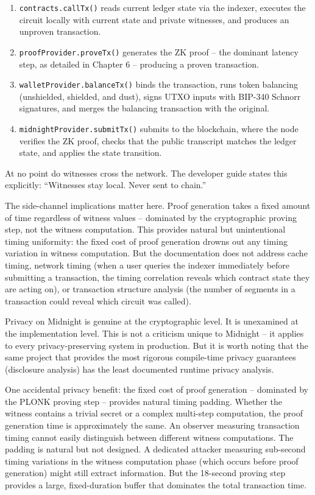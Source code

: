 \documentclass[
  11pt,
  openany]{report}
\begin{document}
\begin{enumerate}
\def\labelenumi{\arabic{enumi}.}
\item
  \texttt{contracts.callTx()} reads current ledger state via the indexer,
  executes the circuit locally with current state and private witnesses, and
  produces an unproven transaction.
\item
  \texttt{proofProvider.proveTx()} generates the ZK proof -- the dominant
  latency step, as detailed in Chapter 6 -- producing a proven transaction.
\item
  \texttt{walletProvider.balanceTx()} binds the transaction, runs token
  balancing (unshielded, shielded, and dust), signs UTXO inputs with BIP-340
  Schnorr signatures, and merges the balancing transaction with the original.
\item
  \texttt{midnightProvider.submitTx()} submits to the blockchain, where the node
  verifies the ZK proof, checks that the public transcript matches the ledger
  state, and applies the state transition.
\end{enumerate}

At no point do witnesses cross the network. The developer guide states this
explicitly: ``Witnesses stay local. Never sent to chain.''

The side-channel implications matter here. Proof generation takes a fixed amount
of time regardless of witness values -- dominated by the cryptographic proving
step, not the witness computation. This provides natural but unintentional
timing uniformity: the fixed cost of proof generation drowns out any timing
variation in witness computation. But the documentation does not address cache
timing, network timing (when a user queries the indexer immediately before
submitting a transaction, the timing correlation reveals which contract state
they are acting on), or transaction structure analysis (the number of segments
in a transaction could reveal which circuit was called).

Privacy on Midnight is genuine at the cryptographic level. It is unexamined at
the implementation level. This is not a criticism unique to Midnight -- it
applies to every privacy-preserving system in production. But it is worth noting
that the same project that provides the most rigorous compile-time privacy
guarantees (disclosure analysis) has the least documented runtime privacy
analysis.

One accidental privacy benefit: the fixed cost of proof generation -- dominated
by the PLONK proving step -- provides natural timing padding. Whether the
witness contains a trivial secret or a complex multi-step computation, the proof
generation time is approximately the same. An observer measuring transaction
timing cannot easily distinguish between different witness computations. The
padding is natural but not designed. A dedicated attacker measuring sub-second
timing variations in the witness computation phase (which occurs before proof
generation) might still extract information. But the 18-second proving step
provides a large, fixed-duration buffer that dominates the total transaction
time.
\end{document}
